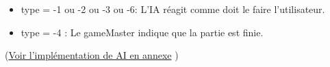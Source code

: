 \documentclass[a4paper,10pt]{article}
\begin{document}
\begin{itemize}
				\begin{itemize}
					\item type = -1 ou -2 ou -3 ou -6: L'IA réagit comme doit le faire l'utilisateur.
					\item type = -4 : Le gameMaster indique que la partie est finie.
				\end{itemize}
		\end{itemize}
	(\hyperlink{AIimplementation}{Voir l'implémentation de AI en annexe} )
	
	
	
\end{document}
